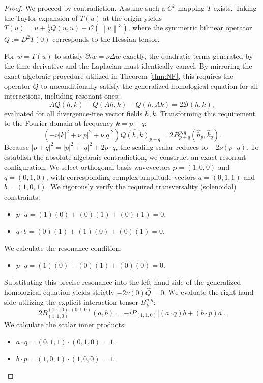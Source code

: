 \documentclass[12pt,a4paper]{article}
\theoremstyle{plain}
\theoremstyle{definition}
\theoremstyle{remark}
\newcommand{\norm}[1]{\left\|#1\right\|}
\newcommand{\BB}{\mathcal{B}}
\begin{document}
\begin{proof}
We proceed by contradiction. Assume such a $C^2$ mapping $T$ exists. Taking the Taylor expansion of $T(u)$ at the origin yields $T(u) = u + \frac{1}{2}Q(u,u) + \mathcal{O}(\norm{u}^3)$, where the symmetric bilinear operator $Q := D^2T(0)$ corresponds to the Hessian tensor. 

For $w = T(u)$ to satisfy $\partial_t w = \nu\Delta w$ exactly, the quadratic terms generated by the time derivative and the Laplacian must identically cancel. By mirroring the exact algebraic procedure utilized in Theorem \ref{thm:NF}, this requires the operator $Q$ to unconditionally satisfy the generalized homological equation for all interactions, including resonant ones:
\[
  AQ(h,k) - Q(Ah,k) - Q(h,Ak) = 2\BB(h,k),
\]
evaluated for all divergence-free vector fields $h, k$. 
Transforming this requirement to the Fourier domain at frequency $k = p+q$:
\[
  (-\nu|k|^2 + \nu|p|^2 + \nu|q|^2) \widehat{Q(h,k)}_{p+q} = 2 B_{p+q}^{p,q}(\hat{h}_p, \hat{k}_q).
\]
Because $|p+q|^2 = |p|^2+|q|^2+2p\cdot q$, the scaling scalar reduces to $-2\nu(p\cdot q)$. 
To establish the absolute algebraic contradiction, we construct an exact resonant configuration. We select orthogonal basis wavevectors $p = (1,0,0)$ and $q = (0,1,0)$, with corresponding complex amplitude vectors $a = (0,1,1)$ and $b = (1,0,1)$.
We rigorously verify the required transversality (solenoidal) constraints:
\begin{itemize}
  \item $p \cdot a = (1)(0) + (0)(1) + (0)(1) = 0$.
  \item $q \cdot b = (0)(1) + (1)(0) + (0)(1) = 0$.
\end{itemize}
We calculate the resonance condition:
\begin{itemize}
  \item $p \cdot q = (1)(0) + (0)(1) + (0)(0) = 0$.
\end{itemize}
Substituting this precise resonance into the left-hand side of the generalized homological equation yields strictly $-2\nu(0)\widehat{Q} = 0$.
We evaluate the right-hand side utilizing the explicit interaction tensor $B_k^{p,q}$:
\[
  2 B_{(1,1,0)}^{(1,0,0),(0,1,0)}(a,b) = -i P_{(1,1,0)} \Big[ (a \cdot q)b + (b \cdot p)a \Big].
\]
We calculate the scalar inner products:
\begin{itemize}
  \item $a \cdot q = (0,1,1) \cdot (0,1,0) = 1$.
  \item $b \cdot p = (1,0,1) \cdot (1,0,0) = 1$.
\end{itemize}

\end{proof}
\end{document}
